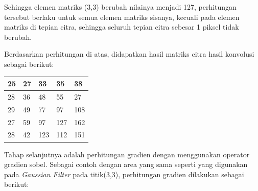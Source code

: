 \noindent Sehingga elemen matriks (3,3) berubah nilainya menjadi 127, perhitungan tersebut berlaku untuk semua elemen matriks sisanya, kecuali pada elemen matriks di tepian citra, sehingga seluruh tepian citra sebesar 1 piksel tidak berubah.

\noindent Berdasarkan perhitungan di atas, didapatkan hasil matriks citra hasil konvolusi sebagai berikut:

\begin{table}[H]
	\centering
	\begin{small}
		\begin{tabular}{|p{1cm}|p{1cm}|p{1cm}|p{1cm}|p{1cm}|}
			\hline
			25 & 27 & 33 & 35 & 38 \\
			\hline
			28 & 36 & 48 & 55 & 27 \\
			\hline
			29 & 49 & 77 & 97 & 108 \\
			\hline
			27 & 59 & 97 & 127 & 162 \\
			\hline
			28 & 42 & 123 & 112 & 151 \\\hline
		\end{tabular}
	\end{small}
	\label{fig:MatriksCitraHasilKonvolusi}
\end{table}

\noindent Tahap selanjutnya adalah perhitungan gradien dengan menggunakan operator gradien sobel. Sebagai contoh dengan area yang sama seperti yang digunakan pada \textit{Gaussian Filter} pada titik(3,3), perhitungan gradien dilakukan sebagai berikut:

